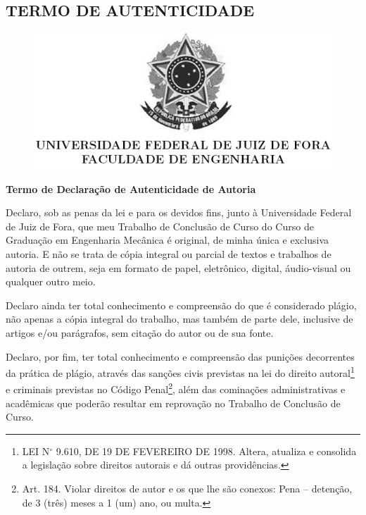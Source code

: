 \documentclass[
12pt,
openany, %
oneside, %
a4paper,			
english,			
brazil			        %
]{abntbibufjf}
\begin{document}
\begin{anexosenv}
	
	
	\chapter{TERMO DE AUTENTICIDADE}
	
	\begin{figure}[h]
		\centering
		\includegraphics[scale=0.75]{01.png}
	\end{figure}
	\begin{center}
		\textbf{Termo de Declaração de Autenticidade de Autoria}\\
		\vfill
	\end{center}
	
	\noindent Declaro, sob as penas da lei e para os devidos fins, junto à Universidade Federal de Juiz de Fora, que meu Trabalho de Conclusão de Curso do Curso de Graduação em Engenharia Mecânica é original, de minha única e exclusiva autoria. E não se trata de cópia integral ou parcial de textos e trabalhos de autoria de outrem, seja em formato de papel, eletrônico, digital, áudio-visual ou qualquer outro meio.
	
	\noindent Declaro ainda ter total conhecimento e compreensão do que é considerado plágio, não apenas a cópia integral do trabalho, mas também de parte dele, inclusive de artigos e/ou parágrafos, sem citação do autor ou de sua fonte. 
	
	\noindent Declaro, por fim, ter total conhecimento e compreensão das punições decorrentes da prática de plágio, através das sanções civis previstas na lei do direito autoral\footnote{{\footnotesize LEI N$\mathrm{^\circ}$ 9.610, DE 19 DE FEVEREIRO DE 1998. Altera, atualiza e consolida a legislação sobre direitos autorais e dá outras providências.}}  e criminais previstas no Código Penal\footnote{{\footnotesize Art. 184. Violar direitos de autor e os que lhe são conexos: Pena – detenção, de 3 (três) meses a 1 (um) ano, ou multa.}}, além das cominações administrativas e acadêmicas que poderão resultar em reprovação no Trabalho de Conclusão de Curso. 
	

\end{anexosenv}
\end{document}
